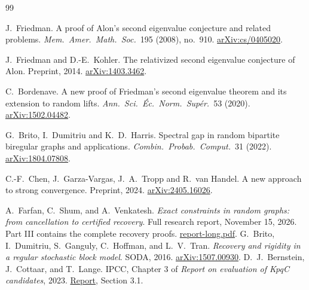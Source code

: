 \documentclass[11pt,letterpaper]{article}
\theoremstyle{definition}
\theoremstyle{remark}
\begin{document}
\begin{thebibliography}{99}

J.~Friedman.
\newblock A proof of Alon's second eigenvalue conjecture and related problems.
\newblock \emph{Mem.\ Amer.\ Math.\ Soc.}\ 195 (2008), no.~910.
\newblock \href{https://arxiv.org/abs/cs/0405020}{arXiv:cs/0405020}.

J.~Friedman and D.-E.~Kohler.
\newblock The relativized second eigenvalue conjecture of Alon.
\newblock Preprint, 2014. \href{https://arxiv.org/abs/1403.3462}{arXiv:1403.3462}.

C.~Bordenave.
\newblock A new proof of Friedman's second eigenvalue theorem and its extension to random lifts.
\newblock \emph{Ann.\ Sci.\ \'Ec.\ Norm.\ Sup\'er.}\ 53 (2020).
\newblock \href{https://arxiv.org/abs/1502.04482}{arXiv:1502.04482}.

G.~Brito, I.~Dumitriu and K.~D.~Harris.
\newblock Spectral gap in random bipartite biregular graphs and applications.
\newblock \emph{Combin.\ Probab.\ Comput.}\ 31 (2022).
\newblock \href{https://arxiv.org/abs/1804.07808}{arXiv:1804.07808}.

C.-F.~Chen, J.~Garza-Vargas, J.~A.~Tropp and R.~van Handel.
\newblock A new approach to strong convergence.
\newblock Preprint, 2024. \href{https://arxiv.org/abs/2405.16026}{arXiv:2405.16026}.


A.~Farfan, C.~Shum, and A.~Venkatesh.
\newblock \emph{Exact constraints in random graphs: from cancellation to certified recovery}.
\newblock Full research report, November 15, 2026. Part III contains the complete recovery proofs.
\newblock \href{report-long.pdf}{report-long.pdf}.
G.~Brito, I.~Dumitriu, S.~Ganguly, C.~Hoffman, and L.~V.~Tran.
\newblock \emph{Recovery and rigidity in a regular stochastic block model}. SODA, 2016.
\newblock \href{https://arxiv.org/abs/1507.00930}{arXiv:1507.00930}.
D.~J.~Bernstein, J.~Cottaar, and T.~Lange.
\newblock IPCC, Chapter 3 of \emph{Report on evaluation of KpqC candidates}, 2023.
\newblock \href{https://math.deweger.net/reports/[2023]KpqC.pdf}{Report}, Section 3.1.

\end{thebibliography}
\end{document}
